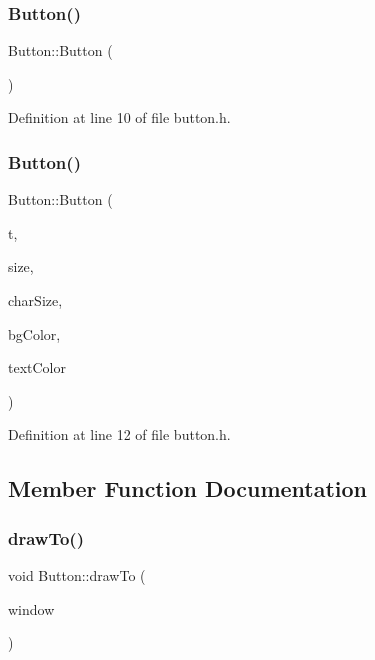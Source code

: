 \subsubsection{\texorpdfstring{Button()}{Button()}\hspace{0.1cm}{\footnotesize\ttfamily [1/2]}}
{\footnotesize\ttfamily Button\+::\+Button (\begin{DoxyParamCaption}{ }\end{DoxyParamCaption})\hspace{0.3cm}{\ttfamily [inline]}}



Definition at line 10 of file button.\+h.

\mbox{\label{class_button_a7219fc574a2a6d3f77d4e83edb0ec909}} 
\subsubsection{\texorpdfstring{Button()}{Button()}\hspace{0.1cm}{\footnotesize\ttfamily [2/2]}}
{\footnotesize\ttfamily Button\+::\+Button (\begin{DoxyParamCaption}\item[{std\+::string}]{t,  }\item[{sf\+::\+Vector2f}]{size,  }\item[{int}]{char\+Size,  }\item[{sf\+::\+Color}]{bg\+Color,  }\item[{sf\+::\+Color}]{text\+Color }\end{DoxyParamCaption})\hspace{0.3cm}{\ttfamily [inline]}}



Definition at line 12 of file button.\+h.



\subsection{Member Function Documentation}
\mbox{\label{class_button_a1feaea3cde433ed7d1ef1312a3893402}} 
\subsubsection{\texorpdfstring{draw\+To()}{drawTo()}}
{\footnotesize\ttfamily void Button\+::draw\+To (\begin{DoxyParamCaption}\item[{sf\+::\+Render\+Window \&}]{window }\end{DoxyParamCaption})\hspace{0.3cm}{\ttfamily [inline]}}



